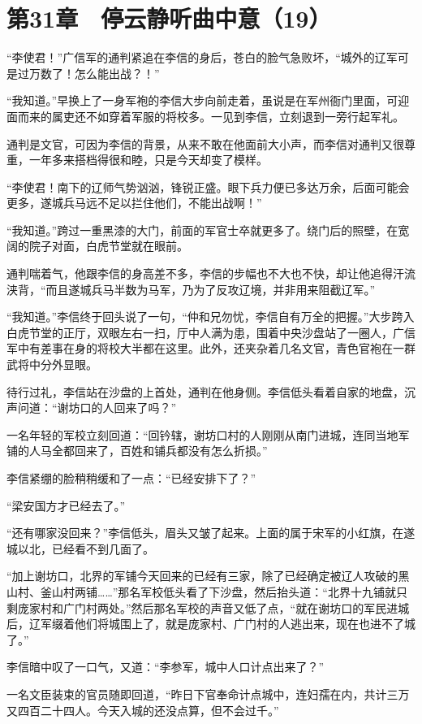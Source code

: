\section{第31章　停云静听曲中意（19）}

“李使君！”广信军的通判紧追在李信的身后，苍白的脸气急败坏，“城外的辽军可是过万数了！怎么能出战？！”

“我知道。”早换上了一身军袍的李信大步向前走着，虽说是在军州衙门里面，可迎面而来的属吏还不如穿着军服的将校多。一见到李信，立刻退到一旁行起军礼。

通判是文官，可因为李信的背景，从来不敢在他面前大小声，而李信对通判又很尊重，一年多来搭档得很和睦，只是今天却变了模样。

“李使君！南下的辽师气势汹汹，锋锐正盛。眼下兵力便已多达万余，后面可能会更多，遂城兵马远不足以拦住他们，不能出战啊！”

“我知道。”跨过一重黑漆的大门，前面的军官士卒就更多了。绕门后的照壁，在宽阔的院子对面，白虎节堂就在眼前。

通判喘着气，他跟李信的身高差不多，李信的步幅也不大也不快，却让他追得汗流浃背，“而且遂城兵马半数为马军，乃为了反攻辽境，并非用来阻截辽军。”

“我知道。”李信终于回头说了一句，“仲和兄勿忧，李信自有万全的把握。”大步跨入白虎节堂的正厅，双眼左右一扫，厅中人满为患，围着中央沙盘站了一圈人，广信军中有差事在身的将校大半都在这里。此外，还夹杂着几名文官，青色官袍在一群武将中分外显眼。

待行过礼，李信站在沙盘的上首处，通判在他身侧。李信低头看着自家的地盘，沉声问道：“谢坊口的人回来了吗？”

一名年轻的军校立刻回道：“回钤辖，谢坊口村的人刚刚从南门进城，连同当地军铺的人马全都回来了，百姓和铺兵都没有怎么折损。”

李信紧绷的脸稍稍缓和了一点：“已经安排下了？”

“梁安国方才已经去了。”

“还有哪家没回来？”李信低头，眉头又皱了起来。上面的属于宋军的小红旗，在遂城以北，已经看不到几面了。

“加上谢坊口，北界的军铺今天回来的已经有三家，除了已经确定被辽人攻破的黑山村、釜山村两铺……”那名军校低头看了下沙盘，然后抬头道：“北界十九铺就只剩庞家村和广门村两处。”然后那名军校的声音又低了点，“就在谢坊口的军民进城后，辽军缀着他们将城围上了，就是庞家村、广门村的人逃出来，现在也进不了城了。”

李信暗中叹了一口气，又道：“李参军，城中人口计点出来了？”

一名文臣装束的官员随即回道，“昨日下官奉命计点城中，连妇孺在内，共计三万又四百二十四人。今天入城的还没点算，但不会过千。”

